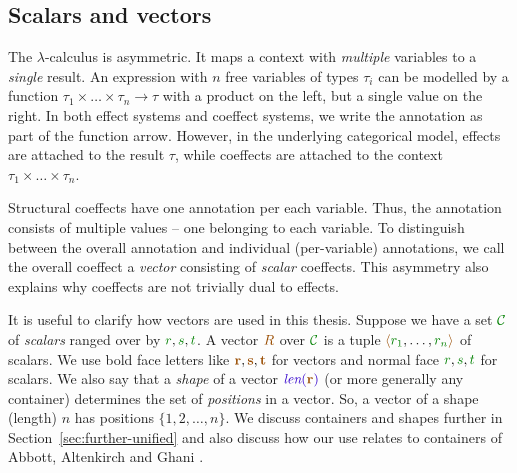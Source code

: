 
\subsection{Scalars and vectors}
\label{sec:applications-strucutre-vec}

The $\lambda$-calculus is asymmetric. It maps a context with \emph{multiple} variables to a
\emph{single} result. An expression with $n$ free variables of types $\tau_i$ can be modelled by a function
$\tau_1 \times \ldots \times \tau_n \rightarrow \tau$ with a product on the left, but a single value
on the right. In both effect systems and coeffect systems, we write the annotation as part of
the function arrow. However, in the underlying categorical model, effects are attached to the result
$\tau$, while coeffects are attached to the context $\tau_1 \times \ldots \times \tau_n$.

Structural coeffects have one annotation per each variable. Thus, the annotation consists
of multiple values -- one belonging to each variable. To distinguish between the overall annotation
and individual (per-variable) annotations, we call the overall coeffect a \emph{vector} consisting of
\emph{scalar} coeffects. This asymmetry also explains why coeffects are not trivially dual to
effects.

It is useful to clarify how vectors are used in this thesis. Suppose we have a set $\C$ of
\emph{scalars} ranged over by $\cclrd{r},\cclrd{s},\cclrd{t}$. A vector $\aclrd{R}$
over $\C$ is a tuple $\alift{ \cclrd{r_1}, \ldots, \cclrd{r_n} }$ of scalars.
We use bold face letters like $\aclrd{\textbf{r}}, \aclrd{\textbf{s}}, \aclrd{\textbf{t}}$ for
vectors and normal face $\cclrd{r},\cclrd{s},\cclrd{t}$ for scalars. We also say that a
\emph{shape} of a vector $\slen{\aclrd{\textbf{r}}}$ (or more generally any container)
determines the set of \emph{positions} in a vector. So, a vector of a shape (length) $n$ has positions
$\{ 1, 2, \ldots, n \}$. We discuss containers and shapes further in Section~\ref{sec:further-unified} and also
discuss how our use relates to containers of Abbott, Altenkirch and Ghani \cite{types-containers}.

